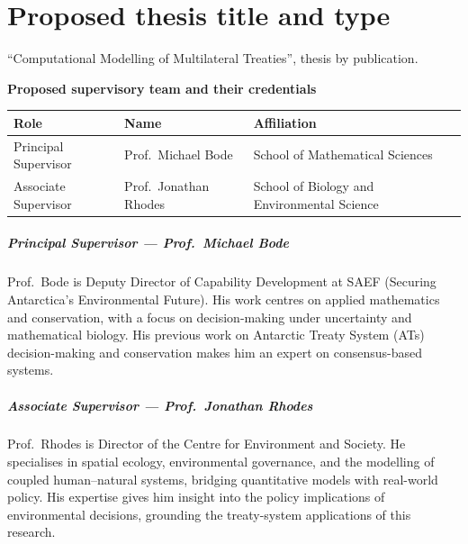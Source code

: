 \chapter*{Proposed thesis title and type}

``Computational Modelling of Multilateral Treaties'', thesis by publication.

\vspace{2em}
{\noindent\Huge\bfseries Proposed supervisory team and their credentials\par}
\vspace{1.5em}

\begin{tabular}{@{}lll@{}}
  \toprule
  \textbf{Role}                & \textbf{Name}              & \textbf{Affiliation} \\
  \midrule
  Principal Supervisor         & Prof.\ Michael Bode        & School of Mathematical Sciences \\[4pt]
  Associate Supervisor         & Prof.\ Jonathan Rhodes     & School of Biology and Environmental Science \\
  \bottomrule
\end{tabular}

\vspace{1.5em}

\paragraph{Principal Supervisor — Prof.\ Michael Bode}
Prof.\ Bode is Deputy Director of Capability Development at SAEF (Securing Antarctica's
 Environmental Future). His work centres on applied mathematics and conservation, with 
 a focus on decision-making under uncertainty and mathematical biology. His previous work
on Antarctic Treaty System (ATs) decision-making and conservation makes him an expert
on consensus-based systems. 

\paragraph{Associate Supervisor — Prof.\ Jonathan Rhodes}
Prof.\ Rhodes is Director of the Centre for Environment and Society. He specialises in
spatial ecology, environmental governance, and the modelling of coupled human–natural
systems, bridging quantitative models with real-world policy. His expertise gives him
insight into the policy implications of environmental decisions, grounding the
treaty-system applications of this research.
